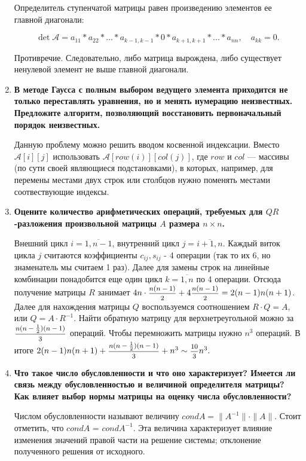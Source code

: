 \documentclass[12pt, a4paper]{article}
\begin{document}
\begin{enumerate}
Определитель ступенчатой матрицы равен произведению элементов ее главной диагонали:

\[
\det \mathcal{A} = a_{11} * a_{22} * ... * a_{k-1, k-1} * 0 * a_{k+1, k+1} * ... * a_{nn}, \quad a_{kk} = 0.
\]

Противречие. Следовательно, либо матрица вырождена, либо существует ненулевой элемент не выше главной диагонали. 


\pagebreak

\item{\bf В методе Гаусса с полным выбором ведущего элемента
приходится не только переставлять уравнения, но и менять нумерацию неизвестных. Предложите алгоритм, позволяющий восстановить первоначальный порядок неизвестных.}

Данную проблему можно решить вводом косвенной индексации. Вместо $\mathcal{A}[i][j]$ использовать $\mathcal{A}[row(i)][col(j)]$, где $row$ и $col$ --- массивы (по сути своей являющиеся подстановками), в которых, например, для перемены местами двух строк или столбцов нужно поменять местами соотвествующие индексы.

\item{\bf Оцените количество арифметических операций, требуемых для 	$QR$-разложения произвольной матрицы $A$ размера $n \times n$.}

Внешний цикл $i = \overline{1 , n-1}$, внутренний цикл $j = \overline{i+1,n}$. Каждый виток цикла $j$ считаются коэффициенты $c_{ij}, s_{ij}$ - 4 операции (так то их 6, но знаменатель мы считаем 1 раз). Далее для замены строк на линейные комбинации понадобится еще один цикл $k =\overline{1,n}$ по 4 операции. Отсюда получение матрицы $R$ занимает $4n\cdot \hbox{\footnotesize$\displaystyle\frac{n(n-1)}{2}$} + 4\hbox{\footnotesize$\displaystyle\frac{n(n-1)}{2}$} = 2(n-1)n(n+1)$. Далее для нахождения матрицы $Q$ воспользуемся соотношением $R\cdot Q = A$, или $Q = A\cdot R^{-1}$. Найти обратную матрицу для верхнетреугольной можно за $\hbox{\footnotesize$\displaystyle\frac{n(n-\frac{1}{2})(n-1)}{3}$}$ операций. Чтобы перемножить матрицы нужно $n^3$ операций. В итоге $2(n-1)n(n+1)+\hbox{\footnotesize$\displaystyle\frac{n(n-\frac{1}{2})(n-1)}{3}$} + n^3\sim \hbox{\footnotesize$\displaystyle\frac{10}{3}$}n^3.$

\item{\bf Что такое число обусловленности и что оно характеризует? Имеется ли связь между обусловленностью и величиной определителя матрицы? Как влияет выбор нормы матрицы на оценку числа обусловленности?}

Числом обусловленности называют величину $ cond{A} = \| A^{-1} \| \cdot \| A \| .$ Стоит отметить, что $ cond{A} $ = $ cond{A^{-1}} .$ Эта величина характеризует влияние изменения значений правой части на решение системы; отклонение полученного решения от исходного.


\end{enumerate}
\end{document}
